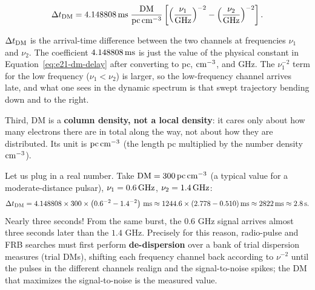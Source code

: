 \begin{equation}
  \Delta t_{\rm DM}
  =
  4.148808\,{\rm ms}\;
  \frac{{\rm DM}}{{\rm pc\,cm^{-3}}}
  \left[
  \left(\frac{\nu_1}{\rm GHz}\right)^{-2}
  -
  \left(\frac{\nu_2}{\rm GHz}\right)^{-2}
  \right].
  \label{eq:e21-dispersion-delay}
\end{equation}
\begin{formulaexplain}
\(\Delta t_{\rm DM}\) is the arrival-time difference between the two channels at frequencies \(\nu_1\) and \(\nu_2\). The coefficient \(4.148808\,{\rm ms}\) is just the value of the physical constant in Equation~\eqref{eq:e21-dm-delay} after converting to pc, \({\rm cm^{-3}}\), and GHz. The \(\nu_1^{-2}\) term for the low frequency (\(\nu_1<\nu_2\)) is larger, so the low-frequency channel arrives late, and what one sees in the dynamic spectrum is that swept trajectory bending down and to the right.
\end{formulaexplain}
Third, DM is a \textbf{column density, not a local density}: it cares only about how many electrons there are in total along the way, not about how they are distributed. Its unit is \({\rm pc\,cm^{-3}}\) (the length pc multiplied by the number density \({\rm cm^{-3}}\)).

Let us plug in a real number. Take \({\rm DM}=300\,{\rm pc\,cm^{-3}}\) (a typical value for a moderate-distance pulsar), \(\nu_1=0.6\,{\rm GHz}\), \(\nu_2=1.4\,{\rm GHz}\):
\[
  \Delta t_{\rm DM}=4.148808\times300\times\left(0.6^{-2}-1.4^{-2}\right)\,{\rm ms}
  \approx 1244.6\times(2.778-0.510)\,{\rm ms}\approx 2822\,{\rm ms}\approx 2.8\,{\rm s}.
\]
Nearly three seconds! From the same burst, the \(0.6\) GHz signal arrives almost three seconds later than the \(1.4\) GHz. Precisely for this reason, radio-pulse and FRB searches must first perform \textbf{de-dispersion} over a bank of trial dispersion measures (trial DMs), shifting each frequency channel back according to \(\nu^{-2}\) until the pulses in the different channels realign and the signal-to-noise spikes; the DM that maximizes the signal-to-noise is the measured value.

